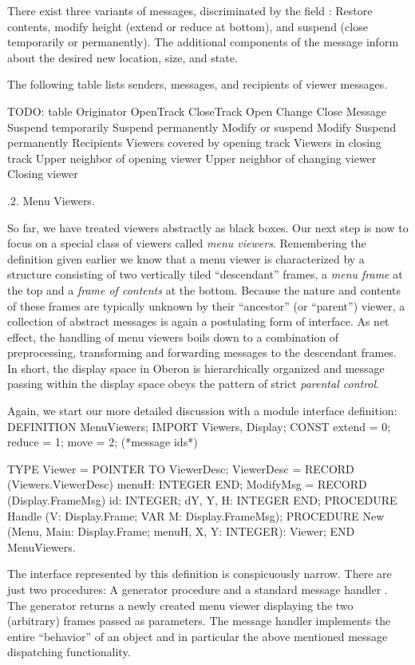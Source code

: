 \noindent There exist three variants of  messages, discriminated by the
field : Restore contents, modify height (extend or reduce at
bottom), and suspend (close temporarily or permanently). The
additional components of the message inform about the desired new
location, size, and state.

The following table lists senders, messages, and recipients of viewer messages.

TODO: table
Originator
OpenTrack CloseTrack Open Change Close
Message
Suspend temporarily Suspend permanently Modify or suspend Modify
Suspend permanently
Recipients
Viewers covered by opening track Viewers in closing track
Upper neighbor of opening viewer Upper neighbor of changing viewer Closing viewer

.2. Menu Viewers.

So far, we have treated viewers abstractly as black boxes. Our next
step is now to focus on a special class of viewers called \emph{menu viewers}. Remembering the definition given earlier we know that a menu
viewer is characterized by a structure consisting of two vertically
tiled ``descendant'' frames, a \emph{menu frame} at the top and a \emph{frame of contents} at the bottom. Because the nature and contents of these
frames are typically unknown by their ``ancestor'' (or ``parent'') viewer,
a collection of abstract messages is again a postulating form of
interface. As net effect, the handling of menu viewers boils down to a
combination of preprocessing, transforming and forwarding messages to
the descendant frames. In short, the display space in Oberon is
hierarchically organized and message passing within the display space
obeys the pattern of strict \emph{parental control}.

Again, we start our more detailed discussion with a module interface definition:
\begintt
DEFINITION MenuViewers;
  IMPORT Viewers, Display;
  CONST extend = 0; reduce = 1; move = 2; (*message ids*)

  TYPE
    Viewer = POINTER TO ViewerDesc;
    ViewerDesc = RECORD (Viewers.ViewerDesc)
      menuH: INTEGER
    END;
    ModifyMsg = RECORD (Display.FrameMsg)
      id: INTEGER;
      dY, Y, H: INTEGER
   END;
   PROCEDURE Handle (V: Display.Frame; VAR M: Display.FrameMsg);
   PROCEDURE New (Menu, Main: Display.Frame;
                  menuH, X, Y: INTEGER): Viewer;
END MenuViewers.
\endtt

The interface represented by this definition is conspicuously
narrow. There are just two procedures: A generator procedure  and a
standard message handler . The generator returns a newly created
menu viewer displaying the two (arbitrary) frames passed as
parameters. The message handler implements the entire ``behavior'' of an
object and in particular the above mentioned message dispatching
functionality.

